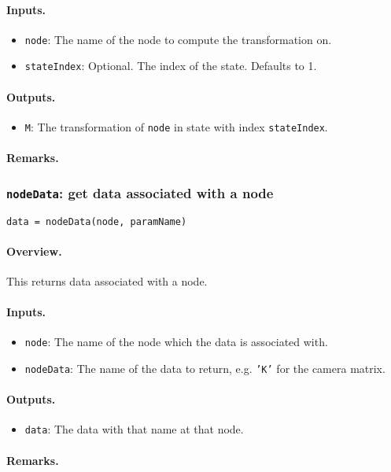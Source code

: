 \paragraph{Inputs.}
\begin{itemize}
	\item \texttt{node}: The name of the node to compute the transformation on.
	\item \texttt{stateIndex}: Optional. The index of the state. Defaults to 1.
\end{itemize}
\paragraph{Outputs.}
\begin{itemize}
	\item \texttt{M}: The transformation of \texttt{node} in state with index \texttt{stateIndex}.
\end{itemize}
\paragraph{Remarks.}

\subsubsection{\texttt{nodeData}: get data associated with a node}
\texttt{data = nodeData(node, paramName)}
\paragraph{Overview.}
This returns data associated with a node.
\paragraph{Inputs.}
\begin{itemize}
	\item \texttt{node}: The name of the node which the data is associated with.
	\item \texttt{nodeData}: The name of the data to return, e.g. \texttt{'K'} for the camera matrix. 
\end{itemize}
\paragraph{Outputs.}
\begin{itemize}
	\item \texttt{data}: The data with that name at that node.
\end{itemize}
\paragraph{Remarks.}
